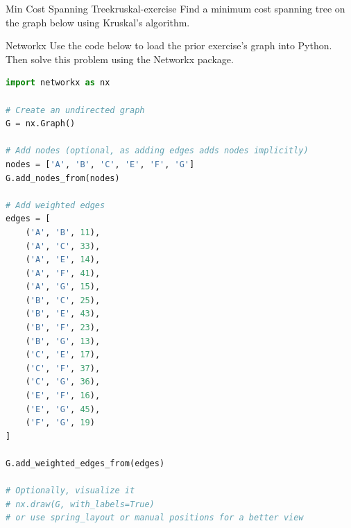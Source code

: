 \begin{ex}{Min Cost Spanning Tree}{kruskal-exercise}{}{} 
\label{ex:kruskal_exercise}
Find a minimum cost spanning tree on the graph below using Kruskal's algorithm.\\
\begin{center}
\end{center}
\end{ex}

\begin{ex}{Networkx}{}
Use the code below to load the prior exercise's graph into Python.  Then solve this problem using the Networkx package.

\begin{lstlisting}[language=Python, caption={Loading the graph into NetworkX}]
import networkx as nx

# Create an undirected graph
G = nx.Graph()

# Add nodes (optional, as adding edges adds nodes implicitly)
nodes = ['A', 'B', 'C', 'E', 'F', 'G']
G.add_nodes_from(nodes)

# Add weighted edges
edges = [
    ('A', 'B', 11),
    ('A', 'C', 33),
    ('A', 'E', 14),
    ('A', 'F', 41),
    ('A', 'G', 15),
    ('B', 'C', 25),
    ('B', 'E', 43),
    ('B', 'F', 23),
    ('B', 'G', 13),
    ('C', 'E', 17),
    ('C', 'F', 37),
    ('C', 'G', 36),
    ('E', 'F', 16),
    ('E', 'G', 45),
    ('F', 'G', 19)
]

G.add_weighted_edges_from(edges)

# Optionally, visualize it
# nx.draw(G, with_labels=True)
# or use spring_layout or manual positions for a better view
\end{lstlisting}

\end{ex}




